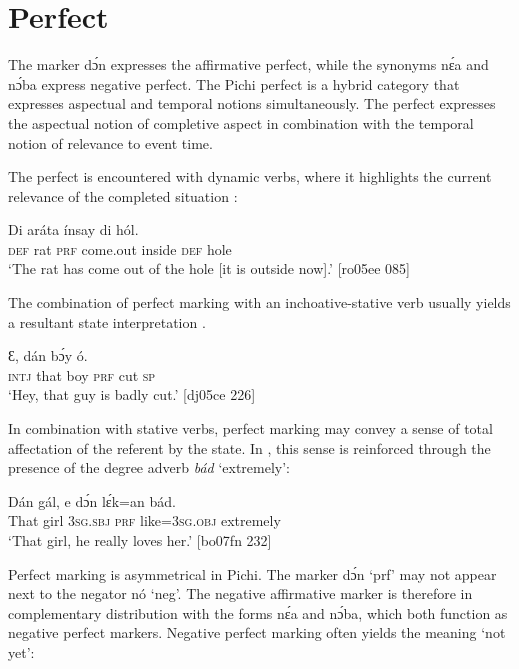 \section{Perfect}\label{sec:6.6}

The marker dɔ́n expresses the affirmative perfect, while the synonyms nɛ́a and nɔ́ba express negative perfect. The Pichi perfect is a hybrid category that expresses aspectual and temporal notions simultaneously. The perfect expresses the aspectual notion of completive aspect{\fff} in combination with the temporal notion of relevance to event time. 


The perfect is encountered with dynamic verbs, where it highlights the current relevance of the completed situation :



\ea%
    \label{ex:key:392}
    \gll Di  aráta        ínsay  di  hól.\\
\textsc{def}  rat    \textsc{prf}  come.out  inside  \textsc{def}  hole\\

\glt ‘The rat has come out of the hole [it is outside now].’ [ro05ee 085]
\z

The combination of perfect marking with an inchoative-stative verb usually yields a resultant state interpretation . 


\ea%
    \label{ex:key:393}
    \gll Ɛ,  dán    bɔ́y        ó.\\
\textsc{intj}  that    boy    \textsc{prf}  cut  \textsc{sp}\\

\glt ‘Hey, that guy is badly cut.’ [dj05ce 226]
\z

In combination with stative verbs, perfect marking may convey a sense of total affectation of the referent by the state. In , this sense is reinforced through the presence of the degree adverb \textit{bád} ‘extremely’:


\ea%
    \label{ex:key:394}
    \gll Dán    gál,  e    dɔ́n    lɛ́k=an    bád.\\
That  girl  \textsc{3sg.sbj}  \textsc{prf}    like=\textsc{3sg.obj}  extremely\\

\glt ‘That girl, he really loves her.’ [bo07fn 232]
\z

Perfect marking is asymmetrical in Pichi. The marker dɔ́n ‘prf’ may not appear next to the negator nó ‘neg’. The negative affirmative marker is therefore in complementary distribution with the forms nɛ́a and nɔ́ba, which both function as negative perfect markers. Negative perfect marking often yields the meaning ‘not yet’: 


